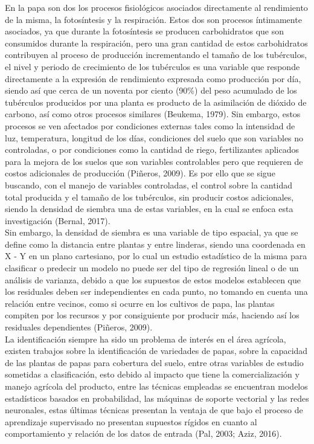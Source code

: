En la papa son dos los procesos fisiológicos asociados directamente al rendimiento de la misma, la fotosíntesis y la respiración. Estos dos son procesos íntimamente asociados, ya que durante la fotosíntesis se producen carbohidratos que son consumidos durante la respiración, pero una gran cantidad de estos carbohidratos contribuyen al proceso de producción incrementando el tamaño de los tubérculos, el nivel y periodo de crecimiento de los tubérculos es una variable que responde directamente a la expresión de rendimiento expresada como producción por día, siendo así que cerca de un noventa por ciento (90\%) del peso acumulado de los tubérculos producidos por una planta es producto de la asimilación de dióxido de carbono, así como otros procesos similares (Beukema, 1979). Sin embargo, estos procesos se ven afectados por condiciones externas tales como la intensidad de luz, temperatura, longitud de los días, condiciones del suelo que son variables no controladas, o por condiciones como la cantidad de riego, fertilizantes aplicados para la mejora de los suelos que son variables controlables pero que requieren de costos adicionales de producción (Piñeros, 2009). Es por ello que se sigue buscando, con el manejo de variables controladas,  el control sobre la cantidad total producida y el tamaño de los tubérculos,  sin producir costos adicionales, siendo la densidad de siembra una de estas variables, en la cual se enfoca esta investigación (Bernal, 2017).\\

Sin embargo,  la densidad de siembra es una variable de tipo espacial, ya que se define como la distancia entre plantas y entre linderas, siendo una coordenada en X - Y en un plano cartesiano, por lo cual un estudio estadístico de la misma para clasificar o predecir un modelo no puede ser del tipo de regresión lineal o de un análisis de varianza,  debido a que los supuestos de estos modelos establecen que los residuales deben ser independientes en cada punto, no tomando en cuenta una relación entre vecinos, como si ocurre en los cultivos de papa, las plantas compiten por los recursos y por consiguiente por producir más, haciendo así los residuales dependientes  (Pi\~neros, 2009). \\

La identificación siempre ha sido un problema de interés en el área agrícola, existen trabajos sobre la identificación de variedades de papas, sobre la capacidad de las plantas de papas para cobertura del suelo, entre otras variables de estudio sometidas a clasificación, esto debido al impacto que tiene la comercialización y manejo agrícola del producto, entre las técnicas empleadas se encuentran modelos estadísticos basados en probabilidad, las máquinas de soporte vectorial y las redes neuronales, estas últimas técnicas presentan la ventaja de que bajo el proceso de aprendizaje supervisado no presentan supuestos rígidos en cuanto al comportamiento y relación de los datos de entrada (Pal, 2003; Aziz, 2016).\\

